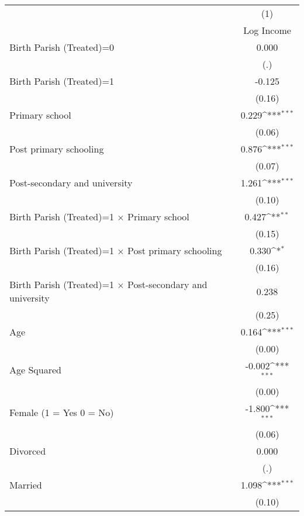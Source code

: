 {
\def\sym#1{\ifmmode^{#1}\else\(^{#1}\)\fi}
\begin{tabular}{l*{1}{c}}
\hline\hline
                    &\multicolumn{1}{c}{(1)}\\
                    &\multicolumn{1}{c}{Log Income}\\
\hline
Birth Parish (Treated)=0&       0.000         \\
                    &         (.)         \\
Birth Parish (Treated)=1&      -0.125         \\
                    &      (0.16)         \\
Primary school      &       0.229\sym{***}\\
                    &      (0.06)         \\
Post primary schooling&       0.876\sym{***}\\
                    &      (0.07)         \\
Post-secondary and university&       1.261\sym{***}\\
                    &      (0.10)         \\
Birth Parish (Treated)=1 $\times$ Primary school&       0.427\sym{**} \\
                    &      (0.15)         \\
Birth Parish (Treated)=1 $\times$ Post primary schooling&       0.330\sym{*}  \\
                    &      (0.16)         \\
Birth Parish (Treated)=1 $\times$ Post-secondary and university&       0.238         \\
                    &      (0.25)         \\
Age                 &       0.164\sym{***}\\
                    &      (0.00)         \\
Age Squared         &      -0.002\sym{***}\\
                    &      (0.00)         \\
Female (1 = Yes 0 = No)&      -1.800\sym{***}\\
                    &      (0.06)         \\
Divorced            &       0.000         \\
                    &         (.)         \\
Married             &       1.098\sym{***}\\
                    &      (0.10)         \\

\end{tabular}}
